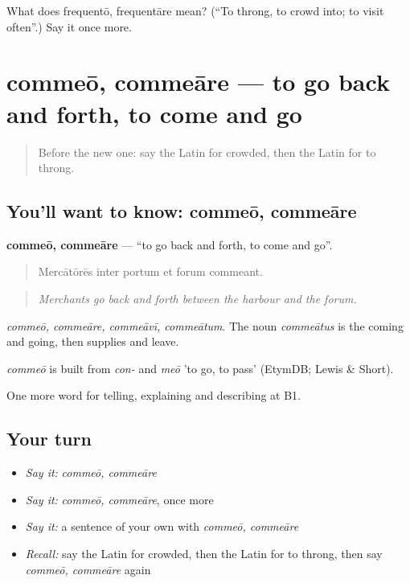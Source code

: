 \begin{tcolorbox}[breakable,colback=teal!4,colframe=teal!35!black,title={Before you move on}]
What does frequentō, frequentāre mean? (\textquotedblleft{}To throng, to crowd into; to visit often\textquotedblright{}.) Say it once more.
\end{tcolorbox}
\section[commeō, commeāre]{commeō, commeāre — to go back and forth, to come and go}

\label{lesson:LA-C460-commeo}



\begin{quote}
Before the new one: say the Latin for crowded, then the Latin for to throng.
\end{quote}

\subsection*{You'll want to know: commeō, commeāre}
\textbf{commeō, commeāre} — \textquotedblleft{}to go back and forth, to come and go\textquotedblright{}.

\begin{quote}
Mercātōrēs inter portum et forum commeant.
\end{quote}

\begin{quote}
\emph{Merchants go back and forth between the harbour and the forum.}
\end{quote}

\emph{commeō, commeāre, commeāvī, commeātum}. The noun \emph{commeātus} is the coming and going, then supplies and leave.

\begin{cousinweb}
\emph{commeō} is built from \emph{con-} and \emph{meō} 'to go, to pass' (EtymDB; Lewis \& Short).
\end{cousinweb}

\begin{grammarlens}[title={What you've built}]
One more word for telling, explaining and describing at B1.
\end{grammarlens}

\subsection*{Your turn}
\begin{itemize}
\raggedright
  \item \emph{Say it:} \emph{commeō, commeāre}
  \item \emph{Say it:} \emph{commeō, commeāre}, once more
  \item \emph{Say it:} a sentence of your own with \emph{commeō, commeāre}
  \item \emph{Recall:} say the Latin for crowded, then the Latin for to throng, then say \emph{commeō, commeāre} again
\end{itemize}


